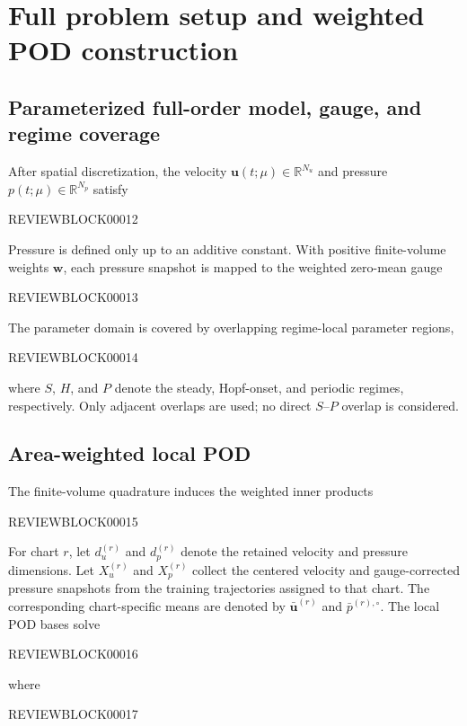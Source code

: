 \documentclass{article}
\begin{document}



\appendix
\section{Full problem setup and weighted POD construction}
\label{app:problem_pod}

\subsection{Parameterized full-order model, gauge, and regime coverage}

After spatial discretization, the velocity
$\bm u(t;\mu)\in\mathbb R^{N_u}$ and pressure
$p(t;\mu)\in\mathbb R^{N_p}$ satisfy


REVIEWBLOCK00012


Pressure is defined only up to an additive constant.
With positive finite-volume weights $\bm w$, each pressure snapshot is mapped
to the weighted zero-mean gauge


REVIEWBLOCK00013



The parameter domain is covered by overlapping regime-local parameter regions,


REVIEWBLOCK00014


where $S$, $H$, and $P$ denote the steady, Hopf-onset, and periodic
regimes, respectively.
Only adjacent overlaps are used; no direct $S$--$P$ overlap is considered.


\subsection{Area-weighted local POD}

The finite-volume quadrature induces the weighted inner products


REVIEWBLOCK00015



For chart $r$, let $d_u^{(r)}$ and $d_p^{(r)}$ denote the retained velocity
and pressure dimensions.
Let $X_u^{(r)}$ and $X_p^{(r)}$ collect the centered velocity and
gauge-corrected pressure snapshots from the training trajectories assigned
to that chart.
The corresponding chart-specific means are denoted by
$\bar{\bm u}^{(r)}$ and $\bar p^{(r),\circ}$.
The local POD bases solve


REVIEWBLOCK00016


where


REVIEWBLOCK00017
\end{document}
